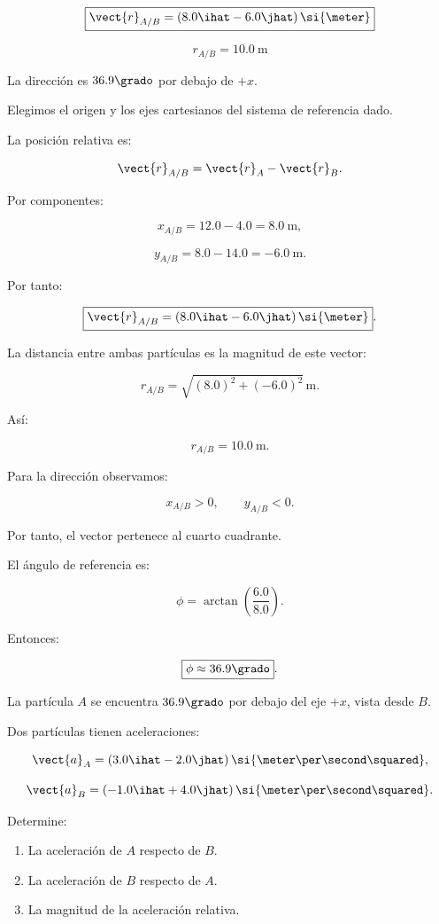\begin{respuesta}
\[
\boxed{
\vect{r}_{A/B}
=
(8.0\ihat-6.0\jhat)\,\si{\meter}
}
\]

\[
\boxed{
r_{A/B}
=
\SI{10.0}{\meter}
}
\]

La dirección es \(36.9\grado\) por debajo de \(+x\).
\end{respuesta}

\begin{explicacion}
Elegimos el origen y los ejes cartesianos
del sistema de referencia dado.

La posición relativa es:

\[
\vect{r}_{A/B}
=
\vect{r}_A-\vect{r}_B.
\]

Por componentes:

\[
x_{A/B}=12.0-4.0=\SI{8.0}{\meter},
\]

\[
y_{A/B}=8.0-14.0=-\SI{6.0}{\meter}.
\]

Por tanto:

\[
\boxed{
\vect{r}_{A/B}
=
(8.0\ihat-6.0\jhat)\,\si{\meter}
}.
\]

La distancia entre ambas partículas es
la magnitud de este vector:

\[
r_{A/B}
=
\sqrt{(8.0)^2+(-6.0)^2}\,\si{\meter}.
\]

Así:

\[
\boxed{
r_{A/B}=\SI{10.0}{\meter}
}.
\]

Para la dirección observamos:

\[
x_{A/B}>0,
\qquad
y_{A/B}<0.
\]

Por tanto, el vector pertenece al cuarto cuadrante.

El ángulo de referencia es:

\[
\phi
=
\arctan\left(\frac{6.0}{8.0}\right).
\]

Entonces:

\[
\boxed{
\phi\approx36.9\grado
}.
\]

La partícula \(A\) se encuentra
\(36.9\grado\) por debajo del eje \(+x\),
vista desde \(B\).
\end{explicacion}


\begin{ejercicio}
Dos partículas tienen aceleraciones:

\[
\vect{a}_A
=
(3.0\ihat-2.0\jhat)\,
\si{\meter\per\second\squared},
\]

\[
\vect{a}_B
=
(-1.0\ihat+4.0\jhat)\,
\si{\meter\per\second\squared}.
\]

Determine:

\begin{enumerate}[label=\alph*)]
    \item La aceleración de \(A\) respecto de \(B\).
    \item La aceleración de \(B\) respecto de \(A\).
    \item La magnitud de la aceleración relativa.
\end{enumerate}
\end{ejercicio}

